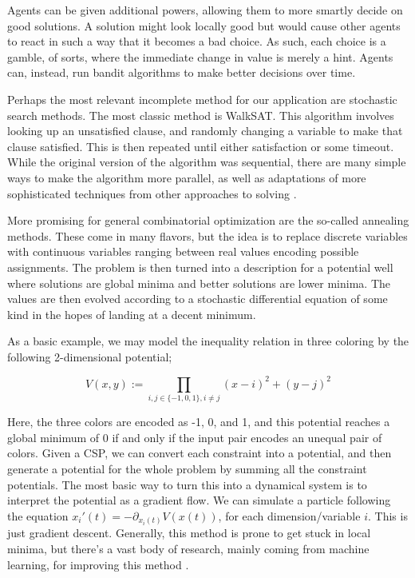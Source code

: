 Agents can be given additional powers, allowing them to more smartly decide on good solutions. A solution might look locally good but would cause other agents to react in such a way that it becomes a bad choice. As such, each choice is a gamble, of sorts, where the immediate change in value is merely a hint. Agents can, instead, run bandit algorithms \citep{lattimore2020bandit} to make better decisions over time.

Perhaps the most relevant incomplete method for our application are stochastic search methods. The most classic method is WalkSAT. This algorithm involves looking up an unsatisfied clause, and randomly changing a variable to make that clause satisfied. This is then repeated until either satisfaction or some timeout. While the original version of the algorithm was sequential, there are many simple ways to make the algorithm more parallel, as well as adaptations of more sophisticated techniques from other approaches to solving \citep{mcdonald2009parallel}.

More promising for general combinatorial optimization are the so-called annealing methods. These come in many flavors, but the idea is to replace discrete variables with continuous variables ranging between real values encoding possible assignments. The problem is then turned into a description for a potential well where solutions are global minima and better solutions are lower minima. The values are then evolved according to a stochastic differential equation of some kind in the hopes of landing at a decent minimum.

As a basic example, we may model the inequality relation in three coloring by the following 2-dimensional potential;

\begin{equation}
    V(x, y) := \prod_{i, j \in \{-1, 0, 1\}, i \neq j} (x - i)^2 + (y - j)^2
\end{equation}

Here, the three colors are encoded as -1, 0, and 1, and this potential reaches a global minimum of 0 if and only if the input pair encodes an unequal pair of colors. Given a CSP, we can convert each constraint into a potential, and then generate a potential for the whole problem by summing all the constraint potentials. The most basic way to turn this into a dynamical system is to interpret the potential as a gradient flow. We can simulate a particle following the equation $x_i'(t) = -\partial_{x_i(t)} V(x(t))$, for each dimension/variable $i$. This is just gradient descent. Generally, this method is prone to get stuck in local minima, but there's a vast body of research, mainly coming from machine learning, for improving this method \citep{ruder2016overview}.

